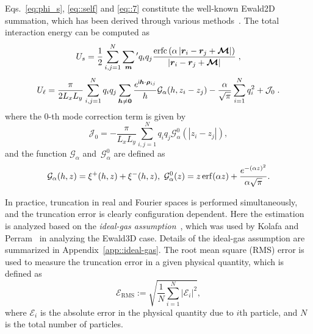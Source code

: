 Eqs.~\eqref{eq:phi_s}, \eqref{eq::self} and \eqref{eq::7} constitute the well-known Ewald2D summation, which has been derived through various methods~\cite{parry1975electrostatic,tornberg2016ewald,heyes1977molecular,de1979electrostatic,PhysRevB.61.6706}.
The total interaction energy can be computed as
\begin{equation}\label{eq::Us_Ewald2D}
    U_{s} =  \frac{1}{2} \sum_{i,j=1}^N \sum_{\bm{m}}{}^\prime q_i q_{j} \frac{\text{erfc}\left(\alpha \left|\bm{r}_i - \bm{r}_{j} + \boldsymbol{\mathcal{M}}\right|\right)}{\left|\bm{r}_i-\bm{r}_{j} + \boldsymbol{\mathcal{M}}\right|}\;,
\end{equation}
\begin{equation}\label{eq::Ul_Ewald2D}
    U_{\ell} =  \frac{\pi}{2L_xL_y}\sum_{i, j=1}^N  q_iq_{j} \sum_{\boldsymbol{h}\neq \boldsymbol{0}}\frac{e^{\mathsf i \boldsymbol{h}\cdot \boldsymbol{\rho}_{ij}}}{h}\mathcal{G}_{\alpha}(h,z_i - z_{j})  - \frac{\alpha}{\sqrt{\pi}}\sum_{i=1}^{N}q_i^2+\mathcal{J}_0\;.
\end{equation}
where the 0-th mode correction term is given by
\begin{equation}\label{eq::J0_Ewald2D}
\mathcal J_0 = -\frac{\pi}{L_xL_y}\sum_{i,j=1}^{N} q_iq_{j}\mathcal{G}_{\alpha}^0(|z_i-z_{j}|),
\end{equation}
and the function $\mathcal{G}_{\alpha}$ and~$\mathcal{G}_{\alpha}^0$ are defined as
\begin{equation}\label{eq::G_Ewald2D}
    \mathcal{G}_{\alpha}(h,z) = \xi^{+}(h, z)+\xi^{-}(h, z),~\mathcal{G}_{\alpha}^0(z) = {z} \operatorname{erf}(\alpha {z}) + \frac{e^{-(\alpha z)^2}}{\alpha \sqrt{\pi}}.
\end{equation}

In practice, truncation in real and Fourier spaces is performed simultaneously, and the truncation error is clearly configuration dependent.
Here the estimation is analyzed based on the \emph{ideal-gas assumption}~\cite{hansen2013theory}, which was used by Kolafa and Perram~\cite{kolafa1992cutoff} in analyzing the Ewald3D case. 
Details of the ideal-gas assumption are summarized in Appendix~\ref{app::ideal-gas}.
The root mean square (RMS) error is used to measure the truncation error in a given physical quantity, which is defined as
\begin{equation}\label{RMS}
	\mathscr{E}_{\text{RMS}} := \sqrt{\frac{1}{N}\sum_{i=1}^{N}\left|\mathscr{E}_i\right|^2},
\end{equation}
where $\mathscr{E}_i$ is the absolute error in the physical quantity due to $i$th particle, and $N$ is the total number of particles.


